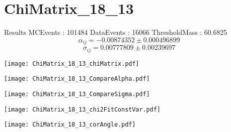 \documentclass[a4paper,12pt]{article}
\begin{document}
\section{ChiMatrix\_18\_13}
\begin{minipage}{0.49\linewidth} Results \newline
MCEvents : 101484\newline
DataEvents : 16066 \newline
ThresholdMass : 60.6825\\
$$\alpha_{ij} = -0.00874352\pm 0.000496899$$
$$\sigma_{ij} = 0.00777809\pm 0.00239697$$
\end{minipage}\hfill
\begin{minipage}{0.49\linewidth} 
\texttt{[image: ChiMatrix\_18\_13\_chiMatrix.pdf]}\\
\end{minipage}
\hfill
\begin{minipage}{0.49\linewidth} 
\texttt{[image: ChiMatrix\_18\_13\_CompareAlpha.pdf]}\\
\end{minipage}
\hfill
\begin{minipage}{0.49\linewidth} 
\texttt{[image: ChiMatrix\_18\_13\_CompareSigma.pdf]}\\
\end{minipage}
\begin{minipage}{0.49\linewidth} 
\texttt{[image: ChiMatrix\_18\_13\_chi2FitConstVar.pdf]}\\
\end{minipage}
\hfill
\begin{minipage}{0.49\linewidth} 
\texttt{[image: ChiMatrix\_18\_13\_corAngle.pdf]}\\
\end{minipage}
\end{document}

